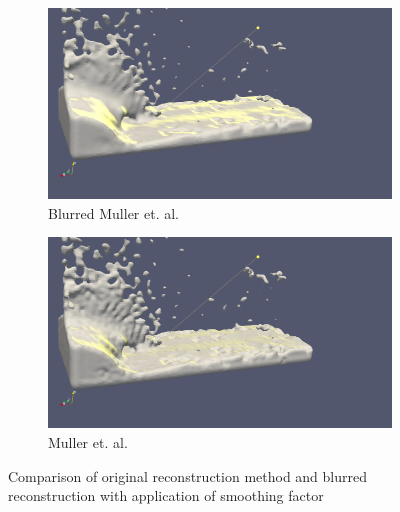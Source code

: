 \begin{figure}[H]
        \begin{subfigure}[b]{0.5\textwidth}
				\includegraphics[width=\textwidth]{figures/DenvityBasedSplashArea2.png}
				\caption{Blurred Muller et. al.}
				\label{fig:blur_with_sf}
        \end{subfigure}
        \begin{subfigure}[b]{0.5\textwidth}
               \includegraphics[width=\textwidth]{figures/DenvityBlurredSplashArea2.png}
               \caption{Muller et. al.}
               \label{fig:db_rec}
        \end{subfigure}
       \caption{Comparison of original reconstruction method and blurred reconstruction with application of smoothing factor}
       \label{fig:blur_thin_area_with_sf}
 \end{figure}
